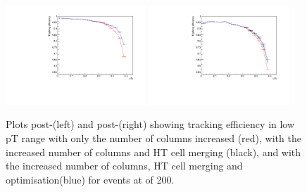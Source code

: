 \begin{figure}[tbp]
\centering
\includegraphics[width=0.47\textwidth]{figs/tk-upgrade/results-lowPtTracking/htTrackingEffVsInvPtFlatGeometry_5000.pdf}
\includegraphics[width=0.47\textwidth]{figs/tk-upgrade/results-lowPtTracking/kfTrackingEffVsInvPtFlatGeometry_5000.pdf}
\caption{Plots post-\HT (left) and post-\KF (right) showing tracking efficiency in low pT range with only the number of \qpt columns increased (red), with the increased number of \qpt columns and HT cell merging (black), and with the increased number of columns, HT cell merging and \KF optimisation(blue) for \ttbar events at \PU of 200. }
\label{fig:2GeVFlatEff}
\end{figure}


